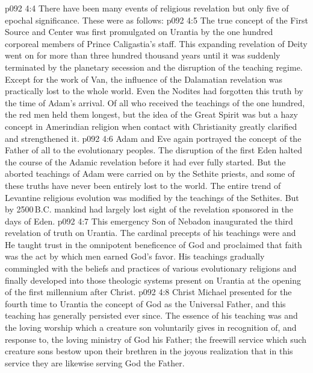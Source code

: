 \vs p092 4:4 \pc There have been many events of religious revelation but only five of epochal significance. These were as follows:
\vs p092 4:5 \bibnobreakspace {} The true concept of the First Source and Center was first promulgated on Urantia by the one hundred corporeal members of Prince Caligastia’s staff. This expanding revelation of Deity went on for more than three hundred thousand years until it was suddenly terminated by the planetary secession and the disruption of the teaching regime. Except for the work of Van, the influence of the Dalamatian revelation was practically lost to the whole world. Even the Nodites had forgotten this truth by the time of Adam’s arrival. Of all who received the teachings of the one hundred, the red men held them longest, but the idea of the Great Spirit was but a hazy concept in Amerindian religion when contact with Christianity greatly clarified and strengthened it.
\vs p092 4:6 \pc {}\bibnobreakspace {} Adam and Eve again portrayed the concept of the Father of all to the evolutionary peoples. The disruption of the first Eden halted the course of the Adamic revelation before it had ever fully started. But the aborted teachings of Adam were carried on by the Sethite priests, and some of these truths have never been entirely lost to the world. The entire trend of Levantine religious evolution was modified by the teachings of the Sethites. But by 2500\,B.C. mankind had largely lost sight of the revelation sponsored in the days of Eden.
\vs p092 4:7 \pc {}\bibnobreakspace {} This emergency Son of Nebadon inaugurated the third revelation of truth on Urantia. The cardinal precepts of his teachings were  and  He taught trust in the omnipotent beneficence of God and proclaimed that faith was the act by which men earned God’s favor. His teachings gradually commingled with the beliefs and practices of various evolutionary religions and finally developed into those theologic systems present on Urantia at the opening of the first millennium after Christ.
\vs p092 4:8 \pc {}\bibnobreakspace {} Christ Michael presented for the fourth time to Urantia the concept of God as the Universal Father, and this teaching has generally persisted ever since. The essence of his teaching was  and  the loving worship which a creature son voluntarily gives in recognition of, and response to, the loving ministry of God his Father; the freewill service which such creature sons bestow upon their brethren in the joyous realization that in this service they are likewise serving God the Father.

